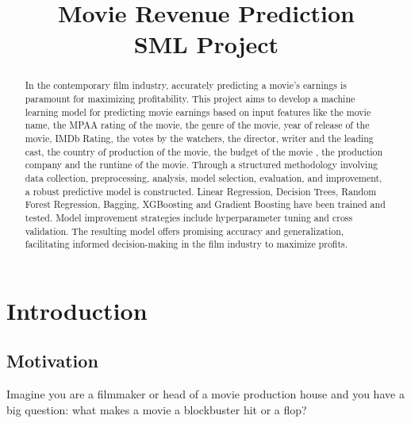 \documentclass[conference]{IEEEtran}
\begin{document}
\title{Movie Revenue Prediction\\ SML Project}

\author{
     \vspace*{3.0pt}
    \and
     \vspace*{3.0pt}
}

\maketitle

\begin{abstract}
    In the contemporary film industry, accurately predicting a movie's earnings is paramount for maximizing profitability. This project aims to develop a machine learning model for predicting movie earnings based on input features like the movie name, the MPAA rating of the movie, the genre of the movie, year of release of the movie, IMDb Rating, the votes by the watchers, the director, writer and the leading cast, the country of production of the movie, the budget of the movie , the production company and the runtime of the movie. Through a structured methodology involving data collection, preprocessing, analysis, model selection, evaluation, and improvement, a robust predictive model is constructed. Linear Regression, Decision Trees, Random Forest Regression, Bagging, XGBoosting and Gradient Boosting have been trained and tested. Model improvement strategies include hyperparameter tuning and cross validation. The resulting model offers promising accuracy and generalization, facilitating informed decision-making in the film industry to maximize profits.
\end{abstract}

\IEEEpeerreviewmaketitle

\section{Introduction}
    \subsection{Motivation}
        Imagine you are a filmmaker or head of a movie production house and you have a big question: what makes a movie a blockbuster hit or a flop?
        
\end{document}
